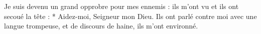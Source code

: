 Je suis devenu un grand opprobre pour mes ennemis : ils m’ont vu et ils ont secoué la tête :
\versseparator
* Aidez-moi, Seigneur mon Dieu.
\versseparator
Ils ont parlé contre moi avec une langue trompeuse, et de discours de haine, ils m’ont environné.
